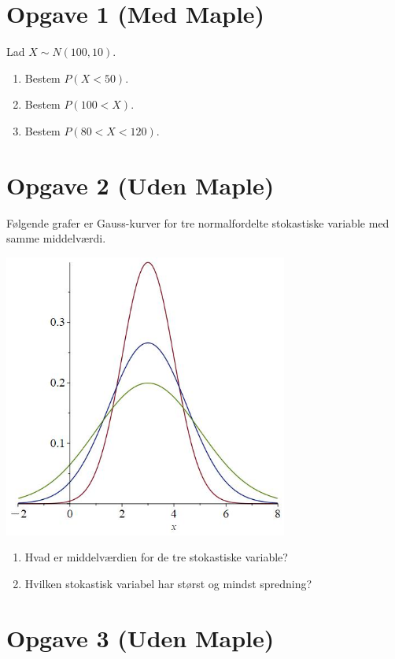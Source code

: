 \section*{Opgave 1 (Med Maple)}

Lad $X \sim N(100,10)$. 
\begin{enumerate}[label=\roman*)]
	\item Bestem $P(X<50)$.
	\item Bestem $P(100<X)$.
	\item Bestem $P(80<X<120)$. 
\end{enumerate}

\section*{Opgave 2 (Uden Maple)}

Følgende grafer er Gauss-kurver for tre normalfordelte stokastiske variable med samme middelværdi.
\begin{center}
	\includegraphics[width=0.7\textwidth]{Billeder/sammemiddel.jpg}
\end{center}
\begin{enumerate}[label=\roman*)]
	\item Hvad er middelværdien for de tre stokastiske variable?
	\item Hvilken stokastisk variabel har størst og mindst spredning?
\end{enumerate}

\section*{Opgave 3 (Uden Maple)}

